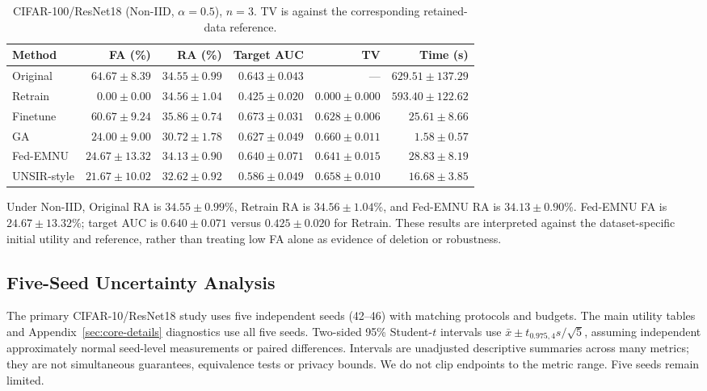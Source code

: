 \begin{table}[H]
\caption{CIFAR-100/ResNet18 (Non-IID, $\alpha=0.5$), $n=3$. TV is against the corresponding retained-data reference.}
\label{tab:c100-noniid}
\centering\scriptsize\setlength{\tabcolsep}{3.5pt}
\begin{tabular}{lrrrrr}
\toprule
Method & FA (\%) & RA (\%) & Target AUC & TV & Time (s)\\
\midrule
Original & $64.67 \pm 8.39$ & $34.55 \pm 0.99$ & $0.643 \pm 0.043$ & --- & $629.51 \pm 137.29$\\
Retrain & $0.00 \pm 0.00$ & $34.56 \pm 1.04$ & $0.425 \pm 0.020$ & $0.000 \pm 0.000$ & $593.40 \pm 122.62$\\
Finetune & $60.67 \pm 9.24$ & $35.86 \pm 0.74$ & $0.673 \pm 0.031$ & $0.628 \pm 0.006$ & $25.61 \pm 8.66$\\
GA & $24.00 \pm 9.00$ & $30.72 \pm 1.78$ & $0.627 \pm 0.049$ & $0.660 \pm 0.011$ & $1.58 \pm 0.57$\\
Fed-EMNU & $24.67 \pm 13.32$ & $34.13 \pm 0.90$ & $0.640 \pm 0.071$ & $0.641 \pm 0.015$ & $28.83 \pm 8.19$\\
UNSIR-style & $21.67 \pm 10.02$ & $32.62 \pm 0.92$ & $0.586 \pm 0.049$ & $0.658 \pm 0.010$ & $16.68 \pm 3.85$\\
\bottomrule
\end{tabular}
\end{table}

Under Non-IID, Original RA is $34.55 \pm 0.99$\%, Retrain RA is $34.56 \pm 1.04$\%, and Fed-EMNU RA is $34.13 \pm 0.90$\%. Fed-EMNU FA is $24.67 \pm 13.32$\%; target AUC is $0.640 \pm 0.071$ versus $0.425 \pm 0.020$ for Retrain. These results are interpreted against the dataset-specific initial utility and reference, rather than treating low FA alone as evidence of deletion or robustness.

\subsection{Five-Seed Uncertainty Analysis}

\label{sec:uncertainty}

The primary CIFAR-10/ResNet18 study uses five independent seeds (42--46) with matching protocols and budgets. The main utility tables and Appendix~\ref{sec:core-details} diagnostics use all five seeds. Two-sided 95\% Student-$t$ intervals use $\bar{x}\pm t_{0.975,4}s/\sqrt{5}$, assuming independent approximately normal seed-level measurements or paired differences. Intervals are unadjusted descriptive summaries across many metrics; they are not simultaneous guarantees, equivalence tests or privacy bounds. We do not clip endpoints to the metric range. Five seeds remain limited.

